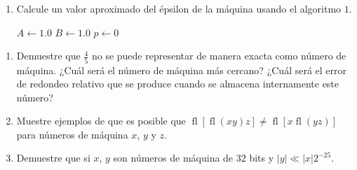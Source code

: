 \begin{frame}
\begin{enumerate}
    \item

          Calcule un valor aproximado del épsilon de la máquina
          usando el algoritmo $1$.

          \begin{algorithm}[H]
            $A\leftarrow 1.0$\;
            $B\leftarrow 1.0$\;
            $p\leftarrow 0$\;
          \end{algorithm}

          \saveenum
  \end{enumerate}
\end{frame}

\begin{frame}
  \begin{enumerate}

    \resume

    \item

          Demuestre que $\frac{4}{5}$ no se puede representar de
          manera exacta como número de máquina.
          ¿Cuál será el número de máquina más cercano?
          ¿Cuál será el error de redondeo relativo que se produce
          cuando se almacena internamente este número?

    \item

          Muestre ejemplos de que es posible que
          \begin{math}
            \operatorname{fl}
            \left[
              \operatorname{fl}
              \left(xy\right)
              z
              \right]\neq
            \operatorname{fl}
            \left[
              x
              \operatorname{fl}
              \left(yz\right)
              \right]
          \end{math}
          para números de máquina $x$, $y$ y $z$.

    \item

          Demuestre que si $x$, $y$ son números de máquina de $32$ bits y
          \begin{math}
            \left|y\right|\ll
            \left|x\right|2^{-25}
          \end{math}.

          \saveenum
  \end{enumerate}
\end{frame}